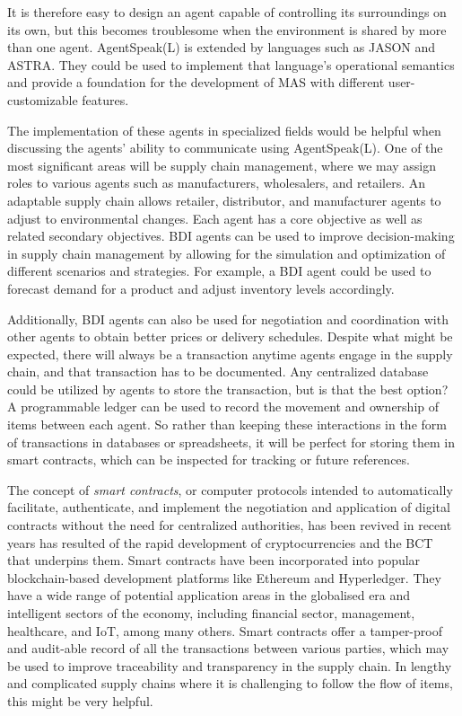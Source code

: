 It is therefore easy to design an agent capable of controlling its surroundings on its own, but this becomes troublesome when the environment is shared by more than one agent. AgentSpeak(L) is extended by languages such as JASON and ASTRA. They could be used to implement that language's operational semantics and provide a foundation for the development of \ac{MAS} with different user-customizable features.

\vspace{.5cm}

The implementation of these agents in specialized fields would be helpful when discussing the agents' ability to communicate using AgentSpeak(L). One of the most significant areas will be supply chain management, where we may assign roles to various agents such as manufacturers, wholesalers, and retailers. An adaptable supply chain allows retailer, distributor, and manufacturer agents to adjust to environmental changes. Each agent has a core objective as well as related secondary objectives. \ac{BDI} agents can be used to improve decision-making in supply chain management by allowing for the simulation and optimization of different scenarios and strategies. For example, a \ac{BDI} agent could be used to forecast demand for a product and adjust inventory levels accordingly. 

\vspace{.5cm}

Additionally, \ac{BDI} agents can also be used for negotiation and coordination with other agents to obtain better prices or delivery schedules. Despite what might be expected, there will always be a transaction anytime agents engage in the supply chain, and that transaction has to be documented. Any centralized database could be utilized by agents to store the transaction, but is that the best option? A programmable ledger can be used to record the movement and ownership of items between each agent. So rather than keeping these interactions in the form of transactions in databases or spreadsheets, it will be perfect for storing them in smart contracts, which can be inspected for tracking or future references.	

\vspace{.5cm}

The concept of \textit{smart contracts}, or computer protocols intended to automatically facilitate, authenticate, and implement the negotiation and application of digital contracts without the need for centralized authorities, has been revived in recent years has resulted of the rapid development of cryptocurrencies and the \ac{BCT} that underpins them. Smart contracts have been incorporated into popular blockchain-based development platforms like Ethereum and Hyperledger. They have a wide range of potential application areas in the globalised era and intelligent sectors of the economy, including financial sector, management, healthcare, and \ac{IoT}, among many others. Smart contracts offer a tamper-proof and audit-able record of all the transactions between various parties, which may be used to improve traceability and transparency in the supply chain. In lengthy and complicated supply chains where it is challenging to follow the flow of items, this might be very helpful.

